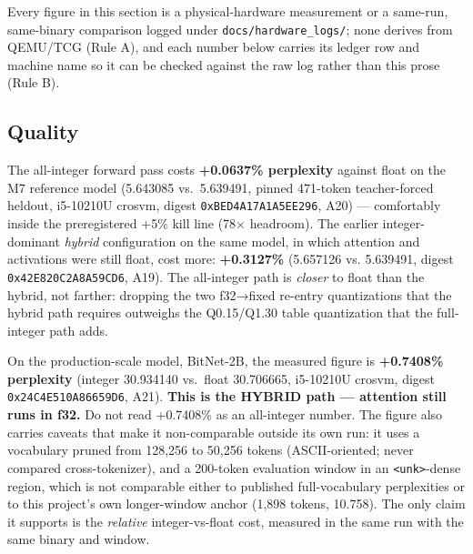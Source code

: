 \documentclass[11pt]{article}
\begin{document}
Every figure in this section is a physical-hardware measurement or a same-run,
same-binary comparison logged under \texttt{docs/hardware\_logs/}; none derives from
QEMU/TCG (Rule A), and each number below carries its ledger row and machine
name so it can be checked against the raw log rather than this prose (Rule B).

\subsection{Quality}\label{quality}

The all-integer forward pass costs \textbf{+0.0637\% perplexity} against float on
the M7 reference model (5.643085 vs.~5.639491, pinned 471-token teacher-forced
heldout, i5-10210U crosvm, digest \texttt{0xBED4A17A1A5EE296}, A20) --- comfortably
inside the preregistered +5\% kill line (78× headroom). The earlier
integer-dominant \emph{hybrid} configuration on the same model, in which attention
and activations were still float, cost more: \textbf{+0.3127\%} (5.657126 vs.
5.639491, digest \texttt{0x42E820C2A8A59CD6}, A19). The all-integer path is \emph{closer}
to float than the hybrid, not farther: dropping the two f32→fixed re-entry
quantizations that the hybrid path requires outweighs the Q0.15/Q1.30 table
quantization that the full-integer path adds.

On the production-scale model, BitNet-2B, the measured figure is
\textbf{+0.7408\% perplexity} (integer 30.934140 vs.~float 30.706665,
i5-10210U crosvm, digest \texttt{0x24C4E510A86659D6}, A21). \textbf{This is the HYBRID
path --- attention still runs in f32.} Do not read +0.7408\% as an all-integer
number. The figure also carries caveats that make it non-comparable outside
its own run: it uses a vocabulary pruned from 128,256 to 50,256 tokens
(ASCII-oriented; never compared cross-tokenizer), and a 200-token evaluation
window in an \texttt{\textless{}unk\textgreater{}}-dense region, which is not comparable either to
published full-vocabulary perplexities or to this project's own
longer-window anchor (1,898 tokens, 10.758). The only claim it supports is
the \emph{relative} integer-vs-float cost, measured in the same run with the same
binary and window.
\end{document}
